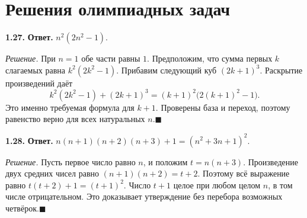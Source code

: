 \documentclass[12pt,a4paper,oneside,openany]{book}
\theoremstyle{colordef}\newtheorem{definition}{Определение}[chapter]
\theoremstyle{plain}\newtheorem{theorem}{Теорема}[chapter]
\theoremstyle{definition}\newtheorem{axiom}{Аксиома}[chapter]
\begin{document}
\par{}\section*{Решения олимпиадных задач}
\textbf{1.27.} \textbf{Ответ.} \(n^2(2n^2-1)\).\par\nopagebreak[4]\textit{Решение.} При \(n=1\) обе части равны \(1\). Предположим, что сумма первых \(k\) слагаемых равна \(k^2(2k^2-1)\). Прибавим следующий куб \((2k+1)^3\). Раскрытие произведений даёт \[k^2(2k^2-1)+(2k+1)^3=(k+1)^2\bigl(2(k+1)^2-1\bigr).\] Это именно требуемая формула для \(k+1\). Проверены база и переход, поэтому равенство верно для всех натуральных \(n\).\hfill\(\blacksquare\)\par
\textbf{1.28.} \textbf{Ответ.} \(n(n+1)(n+2)(n+3)+1=(n^2+3n+1)^2\).\par\nopagebreak[4]\textit{Решение.} Пусть первое число равно \(n\), и положим \(t=n(n+3)\). Произведение двух средних чисел равно \((n+1)(n+2)=t+2\). Поэтому всё выражение равно \(t(t+2)+1=(t+1)^2\). Число \(t+1\) целое при любом целом \(n\), в том числе отрицательном. Это доказывает утверждение без перебора возможных четвёрок.\hfill\(\blacksquare\)\par
\endgroup
\end{document}

